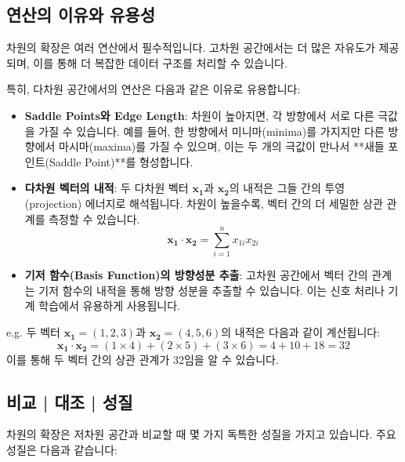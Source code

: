 \subsection{연산의 이유와 유용성}
차원의 확장은 여러 연산에서 필수적입니다. 고차원 공간에서는 더 많은 자유도가 제공되며, 이를 통해 더 복잡한 데이터 구조를 처리할 수 있습니다.

\vspace{1\baselineskip}
\noindent 특히, 다차원 공간에서의 연산은 다음과 같은 이유로 유용합니다:

\begin{itemize}
  \item \textbf{Saddle Points와 Edge Length}: 차원이 높아지면, 각 방향에서 서로 다른 극값을 가질 수 있습니다. 예를 들어, 한 방향에서 미니마(minima)를 가지지만 다른 방향에서 마시마(maxima)를 가질 수 있으며, 이는 두 개의 극값이 만나서 **새들 포인트(Saddle Point)**를 형성합니다.

  \item \textbf{다차원 벡터의 내적}: 두 다차원 벡터 \( \mathbf{x_1} \)과 \( \mathbf{x_2} \)의 내적은 그들 간의 투영(projection) 에너지로 해석됩니다. 차원이 높을수록, 벡터 간의 더 세밀한 상관 관계를 측정할 수 있습니다.
        \[
          \mathbf{x_1} \cdot \mathbf{x_2} = \sum_{i=1}^n x_{1i} x_{2i}
        \]

  \item \textbf{기저 함수(Basis Function)의 방향성분 추출}: 고차원 공간에서 벡터 간의 관계는 기저 함수의 내적을 통해 방향 성분을 추출할 수 있습니다. 이는 신호 처리나 기계 학습에서 유용하게 사용됩니다.
\end{itemize}

\vspace{1\baselineskip}
\noindent {} e.g. 두 벡터 \( \mathbf{x_1} = (1, 2, 3) \)과 \( \mathbf{x_2} = (4, 5, 6) \)의 내적은 다음과 같이 계산됩니다:
\[
  \mathbf{x_1} \cdot \mathbf{x_2} = (1 \times 4) + (2 \times 5) + (3 \times 6) = 4 + 10 + 18 = 32
\]
이를 통해 두 벡터 간의 상관 관계가 32임을 알 수 있습니다.

\subsection{비교 | 대조 | 성질}
차원의 확장은 저차원 공간과 비교할 때 몇 가지 독특한 성질을 가지고 있습니다. 주요 성질은 다음과 같습니다:

